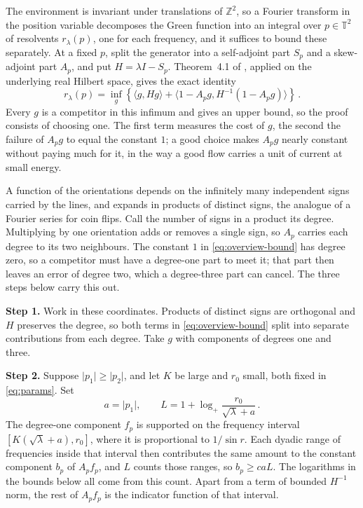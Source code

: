 \documentclass[11pt]{amsart}
\theoremstyle{plain}
\theoremstyle{definition}
\newcommand{\Z}{\mathbb Z}
\newcommand{\T}{\mathbb T}
\newcommand{\1}{\mathbf 1}
\newcommand{\ip}[2]{\langle #1,#2\rangle}
\newcommand{\abs}[1]{\lvert #1\rvert}
\begin{document}
The environment is invariant under translations of $\Z^2$, so a Fourier
transform in the position variable decomposes the Green function into an
integral over $p\in\T^2$ of resolvents $r_\lambda(p)$, one for each frequency,
and it suffices to bound these separately.  At a fixed $p$, split the
generator into a self-adjoint part $S_p$ and a skew-adjoint part $A_p$, and
put $H=\lambda I-S_p$.  Theorem~4.1 of \citet*{KLO12}, applied on the
underlying real Hilbert space, gives the exact identity
\begin{equation}\label{eq:overview-bound}
  r_\lambda(p)=\inf_g\left\{
  \ip g{Hg}+\ip{1-A_pg}{H^{-1}(1-A_pg)}\right\}\, .
\end{equation}
Every $g$ is a competitor in this infimum and gives an upper bound, so the
proof consists of choosing one.  The first term measures the cost of $g$, the
second the failure of $A_pg$ to equal the constant $1$; a good choice makes
$A_pg$ nearly constant without paying much for it, in the way a good flow
carries a unit of current at small energy.

A function of the orientations depends on the infinitely many independent
signs carried by the lines, and expands in products of distinct signs, the
analogue of a Fourier series for coin flips.  Call the number of signs in a
product its degree.  Multiplying by one
orientation adds or removes a single sign, so $A_p$ carries each degree to
its two neighbours.  The constant $1$ in \eqref{eq:overview-bound} has degree
zero, so a competitor must have a degree-one part to meet it; that part then
leaves an error of degree two, which a degree-three part can cancel.  The
three steps below carry this out.

\medskip

\noindent\textbf{Step 1.}  Work in these coordinates.  Products of distinct
signs are orthogonal and $H$ preserves the degree, so both terms in
\eqref{eq:overview-bound} split into separate contributions from each degree.
Take $g$ with components of degrees one and three.

\medskip

\noindent\textbf{Step 2.}  Suppose $\abs{p_1}\geq\abs{p_2}$, and let $K$ be
large and $r_0$ small, both fixed in \eqref{eq:params}.  Set
\[
  a=\abs{p_1},\qquad
  L=1+\log_+\frac{r_0}{\sqrt\lambda+a}\, .
\]
The degree-one component $f_p$ is supported on the frequency interval
$[K(\sqrt\lambda+a),r_0]$, where it is proportional to $1/\sin r$.  Each
dyadic range of frequencies inside that interval then contributes the same
amount to the constant component $b_p$ of $A_pf_p$, and $L$ counts those
ranges, so $b_p\geq caL$.  The logarithms in the bounds below all come from
this count.  Apart from a term of bounded $H^{-1}$ norm, the rest of $A_pf_p$
is the indicator function of that interval.
\end{document}
